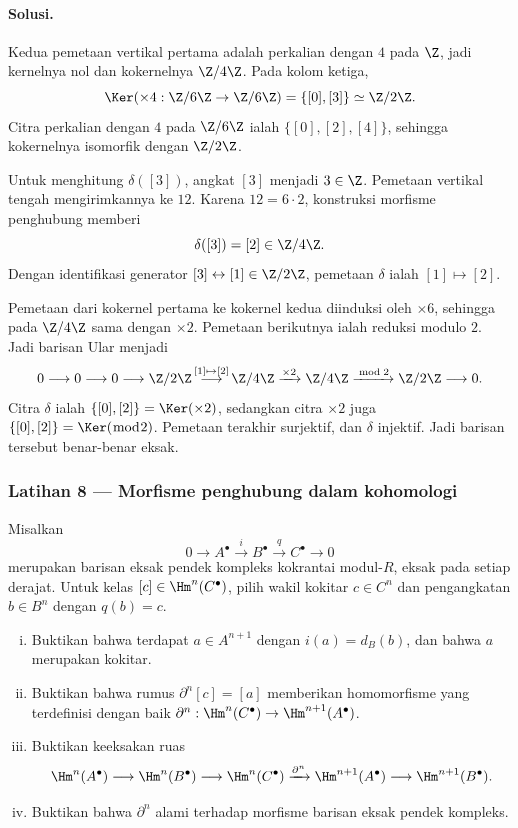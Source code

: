 \paragraph{Solusi.}
\hypertarget{o014.mastery.diagram-chasing.001.sol07}{ }
Kedua pemetaan vertikal pertama adalah perkalian dengan $4$ pada $\Z$, jadi
kernelnya nol dan kokernelnya $\Z/4\Z$. Pada kolom ketiga,
\[
	\Ker(\times4:\Z/6\Z\to\Z/6\Z)=\{[0],[3]\}\simeq\Z/2\Z.
\]
Citra perkalian dengan $4$ pada $\Z/6\Z$ ialah
$\{[0],[2],[4]\}$, sehingga kokernelnya isomorfik dengan $\Z/2\Z$.

Untuk menghitung $\delta([3])$, angkat $[3]$ menjadi $3\in\Z$. Pemetaan
vertikal tengah mengirimkannya ke $12$. Karena $12=6\cdot2$, konstruksi
morfisme penghubung memberi
\[
	\delta([3])=[2]\in\Z/4\Z.
\]
Dengan identifikasi generator $[3]\leftrightarrow[1]\in\Z/2\Z$, pemetaan
$\delta$ ialah $[1]\mapsto[2]$.

Pemetaan dari kokernel pertama ke kokernel kedua diinduksi oleh
$\times6$, sehingga pada $\Z/4\Z$ sama dengan $\times2$. Pemetaan berikutnya
ialah reduksi modulo $2$. Jadi barisan Ular menjadi
\[
	0\longrightarrow0\longrightarrow0\longrightarrow\Z/2\Z
	\mathop{\longrightarrow}^{[1]\mapsto[2]}\Z/4\Z
	\xrightarrow{\times2}\Z/4\Z
	\xrightarrow{\bmod 2}\Z/2\Z\longrightarrow0.
\]
Citra $\delta$ ialah $\{[0],[2]\}=\Ker(\times2)$, sedangkan citra
$\times2$ juga $\{[0],[2]\}=\Ker(\bmod 2)$. Pemetaan terakhir surjektif,
dan $\delta$ injektif. Jadi barisan tersebut benar-benar eksak.

\subsubsection*{Latihan 8 --- Morfisme penghubung dalam kohomologi}
\hypertarget{o014.mastery.diagram-chasing.001.ex08}{ }
\label{mastery:diagram-chasing-001-ex08}

Misalkan
\[
	0\longrightarrow A^\bullet\xrightarrow{i}B^\bullet
	\xrightarrow{q}C^\bullet\longrightarrow0
\]
merupakan barisan eksak pendek kompleks kokrantai modul-$R$, eksak pada
setiap derajat. Untuk kelas $[c]\in\Hm^n(C^\bullet)$, pilih wakil kokitar
$c\in C^n$ dan pengangkatan $b\in B^n$ dengan $q(b)=c$.
\begin{enumerate}[(i)]
	\item Buktikan bahwa terdapat $a\in A^{n+1}$ dengan
	$i(a)=d_B(b)$, dan bahwa $a$ merupakan kokitar.
	\item Buktikan bahwa rumus $\partial^n[c]=[a]$ memberikan homomorfisme
	yang terdefinisi dengan baik
	$\partial^n:\Hm^n(C^\bullet)\to\Hm^{n+1}(A^\bullet)$.
	\item Buktikan keeksakan ruas
	\[
		\Hm^n(A^\bullet)\longrightarrow\Hm^n(B^\bullet)
		\longrightarrow\Hm^n(C^\bullet)\xrightarrow{\partial^n}
		\Hm^{n+1}(A^\bullet)\longrightarrow\Hm^{n+1}(B^\bullet).
	\]
	\item Buktikan bahwa $\partial^n$ alami terhadap morfisme barisan eksak
	pendek kompleks.
\end{enumerate}

